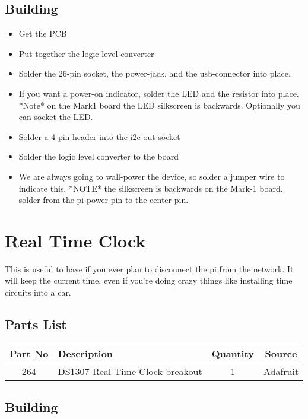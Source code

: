 \documentclass[11pt]{article}
\begin{document}
\subsection{Building}
\begin{itemize}
\item Get the PCB
\item Put together the logic level converter
\item Solder the 26-pin socket, the power-jack, and the usb-connector into 
      place.
\item If you want a power-on indicator, solder the LED and the resistor
      into place.  *Note* on the Mark1 board the LED silkscreen is backwards.
      Optionally you can socket the LED.
\item Solder a 4-pin header into the i2c out socket
\item Solder the logic level converter to the board
\item We are always going to wall-power the device, so solder a jumper
      wire to indicate this.  *NOTE* the silkscreen is backwards on
      the Mark-1 board,
      solder from the pi-power pin to the center pin.
\end{itemize}

\pagebreak
\section{Real Time Clock}

This is useful to have if you ever plan to disconnect the pi from
the network.  It will keep the current time, even if you're doing
crazy things like installing time circuits into a car.

\subsection{Parts List}

\begin{tabular}{|c|l|c|c|}
\hline
Part No	&  Description			&  Quantity	& Source \\
\hline
\hline
264	& DS1307 Real Time Clock breakout & 1	& Adafruit \\ %
\hline
\end{tabular}

\subsection{Building}
\end{document}
